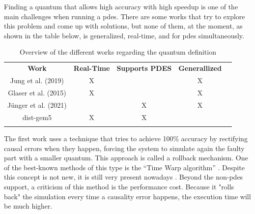 Finding a quantum that allows high accuracy with high speedup is one of the main challenges when running a \gls{pdes}. There are some works 
that try to explore this problem and come up with solutions, but none of them, at the moment, as shown in the table below, is generalized, 
real-time, and for \gls{pdes} simultaneously. 

\begin{table}[H]
\centering
\begin{tabular}{ccccl}
\cline{1-4}
\multicolumn{1}{|c|}{\cellcolor[HTML]{9B9B9B}\textbf{Work}} & \multicolumn{1}{c|}{\cellcolor[HTML]{9B9B9B}\textbf{Real-Time}} & \multicolumn{1}{c|}{\cellcolor[HTML]{9B9B9B}\textbf{Supports PDES}} & \multicolumn{1}{c|}{\cellcolor[HTML]{9B9B9B}\textbf{Generallized}} &  \\ \cline{1-4}
\multicolumn{1}{|c|}{Jung et al. \cite{optimist2} (2019)} & \multicolumn{1}{c|}{X} & \multicolumn{1}{c|}{} & \multicolumn{1}{c|}{X} &  \\ \cline{1-4}
\multicolumn{1}{|c|}{Glaser et al. \cite{GlaserTD} (2015)} & \multicolumn{1}{c|}{X} & \multicolumn{1}{c|}{} & \multicolumn{1}{c|}{X} &  \\ \cline{1-4}
\multicolumn{1}{|c|}{Jünger et al. \cite{optimizingTD} (2021)} & \multicolumn{1}{c|}{} & \multicolumn{1}{c|}{X} & \multicolumn{1}{c|}{X} &  \\ \cline{1-4}
\multicolumn{1}{|c|}{dist-gem5 \cite{dist-gem5}} & \multicolumn{1}{c|}{X} & \multicolumn{1}{c|}{X} & \multicolumn{1}{c|}{} &  \\ \cline{1-4}
\multicolumn{1}{l}{} & \multicolumn{1}{l}{} & \multicolumn{1}{l}{} & \multicolumn{1}{l}{} & 
\end{tabular}
\caption{Overview of the different works regarding the quantum definition}
\label{tab_OverviewDynamicQuantum}
\end{table}

The first work uses a technique that tries to achieve 100\% accuracy by rectifying causal errors when they happen, forcing the system to 
simulate again the faulty part with a smaller quantum. This approach is called a rollback mechanism. One of the best-known methods of this 
type is the “Time
Warp algorithm” \cite{jefferson1985virtual}. Despite this concept is not new, it is still very present nowadays \cite{busnot2020standard}. 
Beyond the non-\gls{pdes} support, a criticism of this method is the performance cost. Because it "rolls back" the simulation every time a 
causality error happens, the execution time will be much higher.

